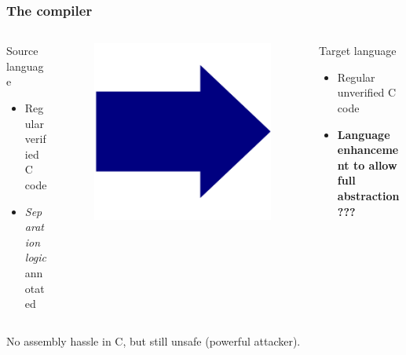 \documentclass{beamer}
\begin{document}
\begin{frame}
\frametitle{The compiler}
\begin{columns}
\begin{column}{0.45\textwidth}
	\begin{block}{Source language}
	\begin{itemize}
	\item Regular verified C code
	\item \emph{Separation logic} annotated
	\end{itemize}
	\end{block}
\end{column}
\begin{column}{0.08\textwidth}
	\begin{figure}
	\includegraphics[width=0.8\linewidth]{BlueArrow}
	\end{figure}
\end{column}
\begin{column}{0.45\textwidth}
    \begin{block}{Target language}
	\begin{itemize}
	\item Regular unverified C code
	\item \textbf{Language enhancement to allow full abstraction???} \\
	\end{itemize}
	\end{block}
\end{column}
\end{columns}
\center No assembly hassle in C, but still unsafe (powerful attacker).

\end{frame}
\end{document}
